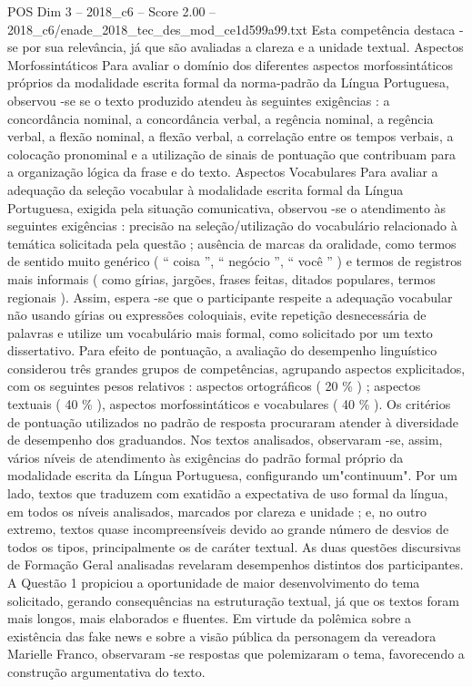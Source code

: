 \begin{textsample}{POS Dim 3 – 2018\_c6 – Score 2.00 – 2018\_c6/enade\_2018\_tec\_des\_mod\_ce1d599a99.txt}
Esta competência destaca -se por sua relevância, já que são avaliadas a clareza e a unidade textual.
Aspectos Morfossintáticos Para avaliar o domínio dos diferentes aspectos morfossintáticos próprios da modalidade escrita formal da norma-padrão da Língua Portuguesa, observou -se se o texto produzido atendeu às seguintes exigências : a concordância nominal, a concordância verbal, a regência nominal, a regência verbal, a flexão nominal, a flexão verbal, a correlação entre os tempos verbais, a colocação pronominal e a utilização de sinais de pontuação que contribuam para a organização lógica da frase e do texto.
Aspectos Vocabulares Para avaliar a adequação da seleção vocabular à modalidade escrita formal da Língua Portuguesa, exigida pela situação comunicativa, observou -se o atendimento às seguintes exigências : precisão na seleção/utilização do vocabulário relacionado à temática solicitada pela questão ; ausência de marcas da oralidade, como termos de sentido muito genérico ( “ coisa ”, “ negócio ”, “ você ” ) e termos de registros mais informais ( como gírias, jargões, frases feitas, ditados populares, termos regionais ).
Assim, espera -se que o participante respeite a adequação vocabular não usando gírias ou expressões coloquiais, evite repetição desnecessária de palavras e utilize um vocabulário mais formal, como solicitado por um texto dissertativo.
Para efeito de pontuação, a avaliação do desempenho linguístico considerou três grandes grupos de competências, agrupando aspectos explicitados, com os seguintes pesos relativos : aspectos ortográficos ( 20 \% ) ; aspectos textuais ( 40 \% ), aspectos morfossintáticos e vocabulares ( 40 \% ).
Os critérios de pontuação utilizados no padrão de resposta procuraram atender à diversidade de desempenho dos graduandos.
Nos textos analisados, observaram -se, assim, vários níveis de atendimento às exigências do padrão formal próprio da modalidade escrita da Língua Portuguesa, configurando um"continuum".
Por um lado, textos que traduzem com exatidão a expectativa de uso formal da língua, em todos os níveis analisados, marcados por clareza e unidade ; e, no outro extremo, textos quase incompreensíveis devido ao grande número de desvios de todos os tipos, principalmente os de caráter textual.
As duas questões discursivas de Formação Geral analisadas revelaram desempenhos distintos dos participantes.
A Questão 1 propiciou a oportunidade de maior desenvolvimento do tema solicitado, gerando consequências na estruturação textual, já que os textos foram mais longos, mais elaborados e fluentes.
Em virtude da polêmica sobre a existência das fake news e sobre a visão pública da personagem da vereadora Marielle Franco, observaram -se respostas que polemizaram o tema, favorecendo a construção argumentativa do texto.

\end{textsample}
